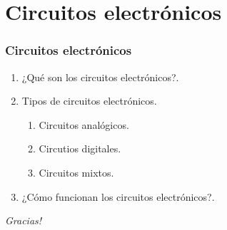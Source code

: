 \documentclass[xcolor=dvipsnames,envcountsect]{beamer}
\begin{document}
\section{Circuitos electrónicos}
\begin{frame}
	\frametitle{Circuitos electrónicos}
	\justifying
		\begin{enumerate}
		\item ¿Qué son los circuitos electrónicos?.
		\item Tipos de circuitos electrónicos.
			\begin{enumerate}
			\item Circuitos analógicos.
			\item Circutios digitales.
			\item Circuitos mixtos.
			\end{enumerate}
		\item ¿Cómo funcionan los circuitos electrónicos?.
		\end{enumerate}		

\end{frame}


	\begin{frame}
		\centering
		\begin{block}
			\scshape
				\begin{center}
					\Huge\emph{Gracias!}
				\end{center}
		\end{block}
	\end{frame}
\end{document}
